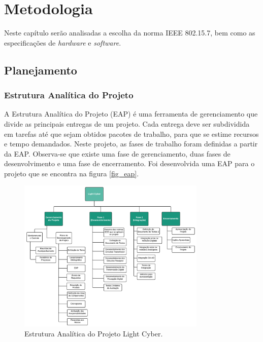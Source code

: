 	\chapter{Metodologia}\label{cap-metodologia}

	Neste capítulo serão analisadas a escolha da norma IEEE 802.15.7, bem como as especificações de \textit{hardware} e \textit{software}.

	\section{Planejamento}\label{sec-planejamento}

	\subsection{Estrutura Analítica do Projeto}\label{subsec-eap}

	A Estrutura Analítica do Projeto (EAP) é uma ferramenta de gerenciamento que divide as principais entregas de um projeto. Cada entrega deve ser subdividida em tarefas até que sejam obtidos pacotes de trabalho, para que se estime recursos e tempo demandados. Neste projeto, as fases de trabalho foram definidas a partir da EAP. Observa-se que existe uma fase de gerenciamento, duas fases de desenvolvimento e uma fase de encerramento. Foi desenvolvida uma EAP para o projeto que se encontra na figura \autoref{fig_eap}.

	\begin{figure}[h!]
		\caption{\label{fig_eap}Estrutura Analítica do Projeto Light Cyber.}
		\centering
		\includegraphics[width=0.8\textwidth, trim={0cm 0cm 0cm 0cm}, clip]{EAP.pdf}
	\end{figure}

